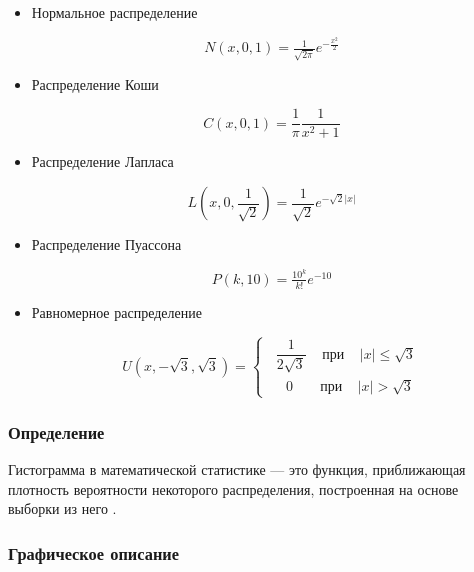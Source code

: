 \documentclass[a4paper,14pt]{article}
\begin{document}
	\begin{itemize}
		\item Нормальное распределение
		
		\begin{equation}
			N(x, 0, 1) = \tfrac{1}{\sqrt{2\pi}}e^{-\frac{x^2}{2}}
		\end{equation}
		
		\item Распределение Коши
		
		\begin{equation}
			C(x, 0, 1) = \dfrac{1}{\pi}\dfrac{1}{x^2+1}
		\end{equation}
		
		\item Распределение Лапласа
		
		\begin{equation}
			L(x, 0, \frac{1}{\sqrt{2}}) =\frac{1}{\sqrt{2}}e^{-{\sqrt{2}}|x|}
		\end{equation}
		
		\item Распределение Пуассона
		
		\begin{equation}
			P(k, 10) = \tfrac{10^k}{k!}e^{-10}
		\end{equation}
		
		\item Равномерное распределение
		
		\begin{equation}
			U(x, -\sqrt{3}, \sqrt{3}) =
			\begin{cases} 
				\;\; \dfrac{1}{2\sqrt{3}} \;\;\;\; \text{при} \;\;\;\; |x| \leq \sqrt{3}\\
				\,\,\,\:\;\; 0 \;\;\;\;\;\;\; \text{при} \;\;\;\; |x| > \sqrt{3}
			\end{cases}
		\end{equation}
		
	\end{itemize}
	
	\subsubsection{Определение}
	
	Гистограмма в математической статистике --- это функция, приближающая плотность вероятности некоторого распределения, построенная на основе выборки из него \cite{s:hist}.
	
	\subsubsection{Графическое описание}
	
\end{document}
